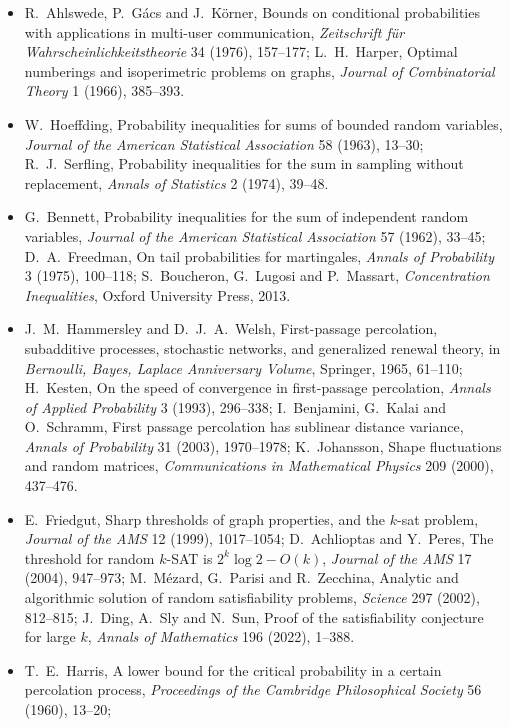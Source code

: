 \begin{itemize}
\emph{FOCS} 2010, 3--10; S.~Lovett and R.~Meka, Constructive discrepancy minimization by walking on the edges, \emph{SIAM Journal on Computing} 44 (2015), 1573--1582.
\item R.~Ahlswede, P.~Gács and J.~Körner, Bounds on conditional probabilities with applications in multi-user communication, \emph{Zeitschrift für Wahrscheinlichkeitstheorie} 34
(1976), 157--177; L.~H.~Harper, Optimal numberings and isoperimetric problems on graphs, \emph{Journal of Combinatorial Theory} 1 (1966), 385--393.
\item W.~Hoeffding, Probability inequalities for sums of bounded random variables, \emph{Journal of the American Statistical Association} 58 (1963), 13--30; R.~J.~Serfling,
Probability inequalities for the sum in sampling without replacement, \emph{Annals of Statistics} 2 (1974), 39--48.
\item G.~Bennett, Probability inequalities for the sum of independent random variables, \emph{Journal of the American Statistical Association} 57 (1962), 33--45; D.~A.~Freedman,
On tail probabilities for martingales, \emph{Annals of Probability} 3 (1975), 100--118; S.~Boucheron, G.~Lugosi and P.~Massart, \emph{Concentration Inequalities}, Oxford University
Press, 2013.
\item J.~M.~Hammersley and D.~J.~A.~Welsh, First-passage percolation, subadditive processes, stochastic networks, and generalized renewal theory, in \emph{Bernoulli, Bayes, Laplace
Anniversary Volume}, Springer, 1965, 61--110; H.~Kesten, On the speed of convergence in first-passage percolation, \emph{Annals of Applied Probability} 3 (1993), 296--338;
I.~Benjamini, G.~Kalai and O.~Schramm, First passage percolation has sublinear distance variance, \emph{Annals of Probability} 31 (2003), 1970--1978; K.~Johansson, Shape
fluctuations and random matrices, \emph{Communications in Mathematical Physics} 209 (2000), 437--476.
\item E.~Friedgut, Sharp thresholds of graph properties, and the $k$-sat problem, \emph{Journal of the AMS} 12 (1999), 1017--1054; D.~Achlioptas and Y.~Peres, The threshold for random
$k$-SAT is $2^k\log2-O(k)$, \emph{Journal of the AMS} 17 (2004), 947--973; M.~Mézard, G.~Parisi and R.~Zecchina, Analytic and algorithmic solution of random satisfiability problems,
\emph{Science} 297 (2002), 812--815; J.~Ding, A.~Sly and N.~Sun, Proof of the satisfiability conjecture for large $k$, \emph{Annals of Mathematics} 196 (2022), 1--388.
\item T.~E.~Harris, A lower bound for the critical probability in a certain percolation process, \emph{Proceedings of the Cambridge Philosophical Society} 56 (1960), 13--20;

\end{itemize}
